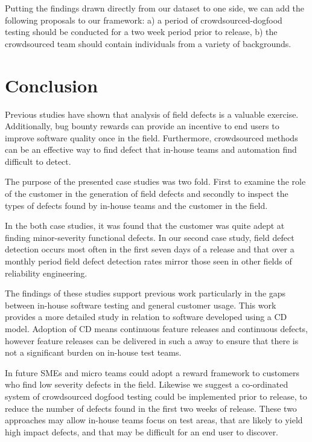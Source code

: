 Putting the findings drawn directly from our dataset to one side, we can add the following proposals to our framework: a) a period of crowdsourced-dogfood testing should be conducted for a two week period prior to release, b) the crowdsourced team should contain individuals from a variety of backgrounds.


\section{Conclusion}

Previous studies have shown that analysis of field defects is a valuable exercise. Additionally, bug bounty rewards can provide an incentive to end users to improve software quality once in the field. Furthermore, crowdsourced methods can be an effective way to find defect that in-house teams and automation find difficult to detect.

The purpose of the presented case studies was two fold. First to examine the role of the customer in the generation of field defects and secondly to inspect the types of defects found by in-house teams and the customer in the field.

In the both case studies, it was found that the customer was quite adept at finding minor-severity functional defects. In our second case study, field defect detection occurs most often in the first seven days of a release and that over a monthly period field defect detection rates mirror those seen in other fields of reliability engineering.

The findings of these studies support previous work particularly in the gaps between in-house software testing and general customer usage.  This work provides a more detailed study in relation to software developed using a CD model. Adoption of CD means continuous feature releases and continuous defects, however feature releases can be delivered in such a away to ensure that there is not a significant burden on in-house test teams. 

In future SMEs and micro teams could adopt a reward framework to customers who find low severity defects in the field. Likewise we suggest a co-ordinated system of crowdsourced dogfood testing could be implemented prior to release, to reduce the number of defects found in the first two weeks of release. These two approaches may allow in-house teams focus on test areas, that are likely to yield high impact defects, and that may be difficult for an end user to discover.


